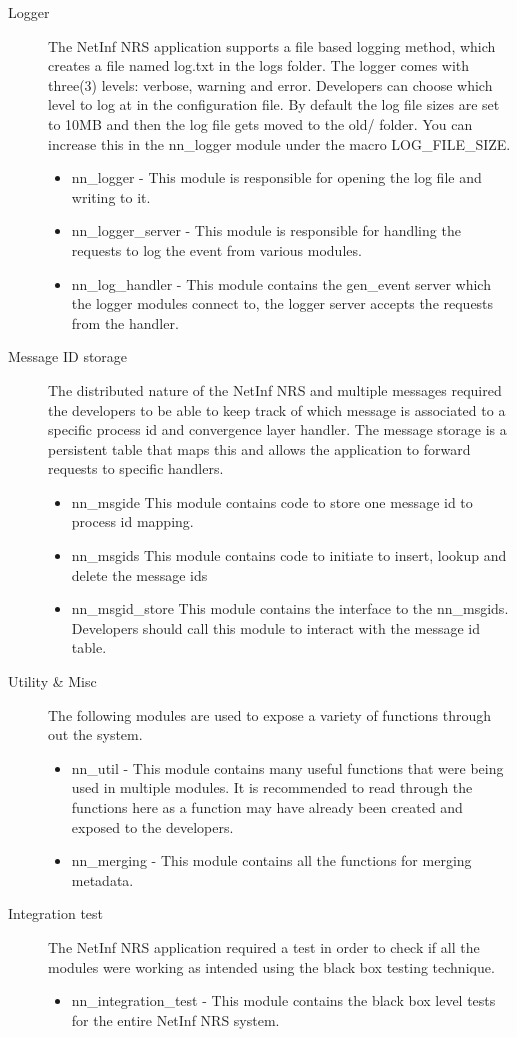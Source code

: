 \begin{description}
\item[Logger]
The NetInf NRS application supports a file based logging method, which creates a file named log.txt in the logs folder. The logger comes with three(3) levels: verbose, warning and error. Developers can choose which level to log at in the configuration file. By default the log file sizes are set to 10MB and then the log file gets moved to the old/ folder. You can increase this in the nn\_logger module under the macro LOG\_FILE\_SIZE.
\begin{itemize}
\item nn\_logger - This module is responsible for opening the log file and writing to it.
\item nn\_logger\_server - This module is responsible for handling the requests to log the event from various modules.
\item nn\_log\_handler - This module contains the gen\_event server which the logger modules connect to, the logger server accepts the requests from the handler.
\end{itemize}
\item [Message ID storage]
The distributed nature of the NetInf NRS and multiple messages required the developers to be able to keep track of which message is associated to a specific process id and convergence layer handler. The message storage is a persistent table that maps this and allows the application to forward requests to specific handlers. 
\begin{itemize}
\item nn\_msgide This module contains code to store one message id to process id mapping. 
\item nn\_msgids This module contains code to initiate to insert, lookup and delete the message ids
\item nn\_msgid\_store This module contains the interface to the nn\_msgids. Developers should call this module to interact with the message id table.
\end{itemize}
\item [Utility \& Misc]
The following modules are used to expose a variety of functions through out the system.
\begin{itemize}
\item nn\_util - This module contains many useful functions that were being used in multiple modules. It is recommended to read through the functions here as a function may have already been created and exposed to the developers.
\item nn\_merging - This module contains all the functions for merging metadata.
\end {itemize}
\item [Integration test]
The NetInf NRS application required a test in order to check if all the modules were working as intended using the black box testing technique. 
\begin{itemize}
\item nn\_integration\_test - This module contains the black box level tests for the entire NetInf NRS system.
\end{itemize}

\end{description}

